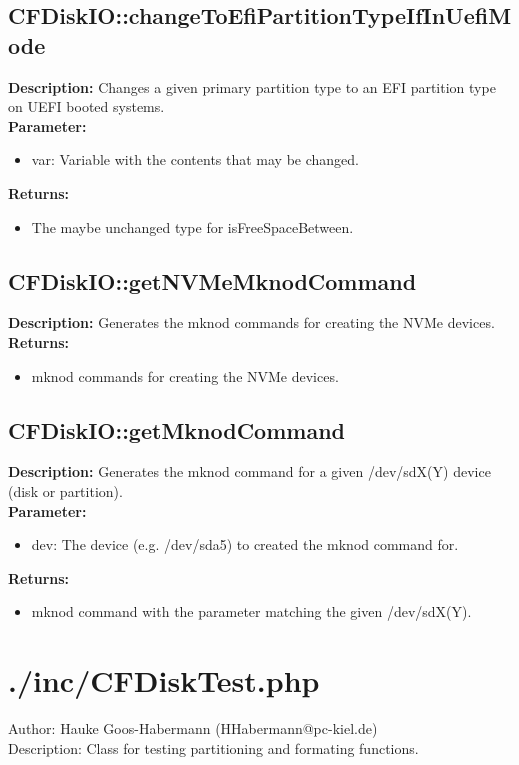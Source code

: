 \subsection{CFDiskIO::changeToEfiPartitionTypeIfInUefiMode}
\textbf{Description:} Changes a given primary partition type to an EFI partition type on UEFI booted systems.\\
\textbf{Parameter:}
\begin{itemize}
\item var: Variable with the contents that may be changed.
\end{itemize}
\textbf{Returns:}
\begin{itemize}
\item The maybe unchanged type for isFreeSpaceBetween.
\end{itemize}

\subsection{CFDiskIO::getNVMeMknodCommand}
\textbf{Description:} Generates the mknod commands for creating the NVMe devices.\\
\textbf{Returns:}
\begin{itemize}
\item mknod commands for creating the NVMe devices.
\end{itemize}

\subsection{CFDiskIO::getMknodCommand}
\textbf{Description:} Generates the mknod command for a given /dev/sdX(Y) device (disk or partition).\\
\textbf{Parameter:}
\begin{itemize}
\item dev: The device (e.g. /dev/sda5) to created the mknod command for.
\end{itemize}
\textbf{Returns:}
\begin{itemize}
\item mknod command with the parameter matching the given /dev/sdX(Y).
\end{itemize}

\newpage\section{./inc/CFDiskTest.php}
 Author: Hauke Goos-Habermann (HHabermann@pc-kiel.de)\\
 Description: Class for testing partitioning and formating functions.\\

